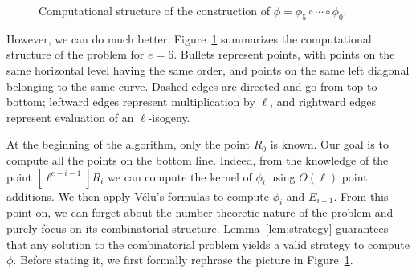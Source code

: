 \documentclass[jmc]{degruyter-journal-a}
\newcommand{\dottriangle}[2][\i-\j]{  \foreach \i in {0,...,#2} {    \foreach \j in {0,...,\i} {      \draw(\i,\j) node{#1};    }  }}
\theoremstyle{definition}
\begin{document}
\begin{figure}[t]
  \centering

  \caption{Computational structure of the construction of
    $\phi=\phi_5\circ\cdots\circ\phi_0$.}
  \label{fig:det}
\end{figure}

However, we can do much better. Figure~\ref{fig:det} summarizes the
computational structure of the problem for $e=6$.  Bullets represent
points, with points on the same horizontal level having the same order, and points on the
same left diagonal belonging to the same curve. Dashed edges are directed
and go from top to bottom; leftward edges represent multiplication by
$\ell$, and rightward edges represent evaluation of an $\ell$-isogeny.

At the beginning of the algorithm, only the point $R_0$ is known. Our
goal is to compute all the points on the bottom line. Indeed, from the
knowledge of the point $[\ell^{e-i-1}]R_i$ we can compute the kernel
of $\phi_i$ using $O(\ell)$ point additions. We then apply V\'elu's
formulas to compute $\phi_i$ and $E_{i+1}$. From this point on, we can
forget about the number theoretic nature of the problem and purely
focus on its combinatorial structure. Lemma~\ref{lem:strategy}
guarantees that any solution to the combinatorial problem yields a
valid strategy to compute $\phi$. Before stating it, we first formally
rephrase the picture in Figure~\ref{fig:det}.
\end{document}
